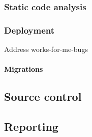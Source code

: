 \subsubsection{Static code analysis}\label{sec:static-code-analysis}

\subsubsection{Deployment}\label{sec:deployment}

Address works-for-me-bugs

\paragraph{Migrations}\label{sec:migrations}

\subsection{Source control}\label{sec:source-control}

\subsection{Reporting}\label{sec:reporting}


